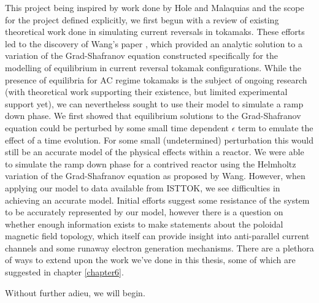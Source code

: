 This project being inspired by work done by Hole and Malaquias and the scope for the project defined explicitly, 
we first begun with a review of existing theoretical work done in simulating current reversals in tokamaks. These 
efforts led to the discovery of Wang's paper \cite{wang-analytic-solution}, which provided an analytic solution 
to a variation of the Grad-Shafranov equation constructed specifically for the modelling of equilibrium in 
current reversal tokamak configurations. While the presence of equilibria for AC regime tokamaks is the subject of 
ongoing research (with theoretical work supporting their existence, but limited experimental support yet), 
we can nevertheless sought to use their model to simulate a ramp down phase. We first showed that equilibrium 
solutions to the Grad-Shafranov equation could be perturbed by some small time dependent $\epsilon$ term to 
emulate the effect of a time evolution. For some small (undetermined) perturbation this would still be an accurate 
model of the physical effects within a reactor. We were able to simulate the ramp down phase for a contrived reactor using 
the Helmholtz variation of the Grad-Shafranov equation as proposed by Wang. However, when applying our model to 
data available from ISTTOK, we see difficulties in achieving an accurate model. Initial efforts suggest some resistance 
of the system to be accurately represented by our model, however there is a question on whether enough 
information exists to make statements about the poloidal magnetic field topology, which itself can provide 
insight into anti-parallel current channels and some runaway electron generation mechanisms. There are a 
plethora of ways to extend upon the work we've done in this thesis, some of which are suggested in chapter \ref{chapter6}.

Without further adieu, we will begin.
